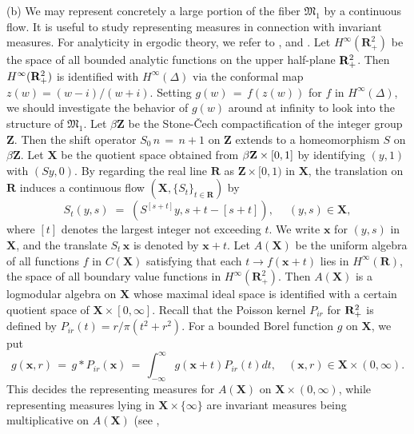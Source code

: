 \documentclass[12pt]{amsart}
\theoremstyle{plain}
\numberwithin{equation}{section}
\begin{document}
\medskip
(b) \; We may represent concretely a large portion of the fiber
$\mathfrak{M}_1$ by a continuous flow. It is useful to study
representing measures in connection with invariant measures.
For analyticity in ergodic theory, we refer to
\cite{M1}, \cite{M2} and \cite{P}. Let $H^\infty(\mathbf{R}^2_+)$
be the space of all bounded analytic functions on the upper
half-plane ${\bf R}^2_+$. Then
$H^\infty({\bf R}^2_+)$ is identified with $H^\infty(\Delta)$
via the conformal map $z(w) =(w-i)/(w+i)$. Setting
$g(w)\,=\,f(z(w))$ for $f$ in $H^\infty(\Delta)$, we should
investigate the behavior of $g(w)$ around at infinity to look
into the structure of $\mathfrak{M}_1$. Let $\beta \mathbf{Z}$
be the Stone-\v{C}ech compactification of the integer group
$\mathbf{Z}$. Then the shift operator $S_0\,n\,=\,n+1$ on
$\mathbf{Z}$ extends to a homeomorphism $S$ on $\beta\mathbf{Z}$.
Let $\mathbf{X}$ be the quotient space obtained from
$\beta {\bf Z}\times [0,1]$ by identifying $(y,1)$ with $(Sy,0)$.
By regarding the real line $\mathbf{R}$ as $\mathbf{Z}\times [0,1)$
in $\mathbf{X}$, the translation on $\mathbf{R}$ induces a
continuous flow $(\mathbf{X},\{S_t\}_{t\in\mathbf{R}})$ by
\begin{equation*}
S_t(y,s)\;=\;(S^{[s+t]}y, s+t-[s+t]),\;\quad (y,s)\in \mathbf{X},
\end{equation*}
where $[t]$ denotes the largest integer not exceeding $t$. We write
$\mathbf{x}$ for $(y,s)$ in $\mathbf{X}$, and the translate
$S_t\,\mathbf{x}$ is denoted by $\mathbf{x}+t$. Let $A(\mathbf{X})$
be the uniform algebra of all functions $f$ in $C(\mathbf{X})$
satisfying that each $t\to f(\mathbf{x}+t)$ lies in
$H^\infty(\mathbf{R})$, the space of all boundary value functions
in $H^\infty(\mathbf{R}^2_+)$. Then $A(\mathbf{X})$ is a logmodular
algebra on $\mathbf{X}$ whose maximal ideal space is identified with
a certain quotient space of $\mathbf{X}\times [0,\infty]$. Recall
that the Poisson kernel $P_{ir}$ for ${\bf R}^2_+$ is defined by $P_{ir}(t)=r/\pi(t^2+r^2)$.
For a bounded Borel function $g$ on $\mathbf{X}$, we put
\begin{equation*}
g(\mathbf{x},r)\,=\, g\ast P_{ir}(\mathbf{x})\,=\,
\int_{-\infty}^\infty g(\mathbf{x}+t) P_{ir}(t)dt,\quad
(\mathbf{x},r) \in \mathbf{X}\times (0,\infty).
\end{equation*}
This decides the representing measures for $A(\mathbf{X})$ on
$\mathbf{X}\times (0,\infty)$, while representing measures
lying in $\mathbf{X}\times \{\infty\}$ are invariant
measures being multiplicative on $A(\mathbf{X})$ (see \cite{M2},
\end{document}
